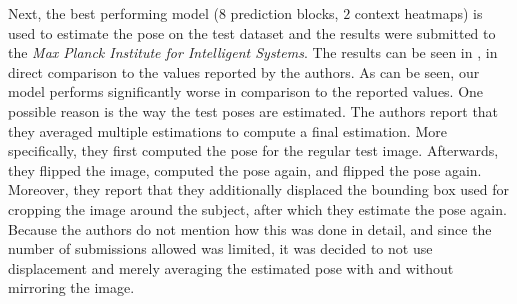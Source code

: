 Next, the best performing model ($8$ prediction blocks, $2$ context heatmaps) is used to estimate the pose on the test dataset and the results were submitted to the \textit{Max Planck Institute for Intelligent Systems}.
The results can be seen in , in direct comparison to the values reported by the authors.
As can be seen, our model performs significantly worse in comparison to the reported values.
One possible reason is the way the test poses are estimated.
The authors report that they averaged multiple estimations to compute a final estimation.
More specifically, they first computed the pose for the regular test image.
Afterwards, they flipped the image, computed the pose again, and flipped the pose again.
Moreover, they report that they additionally displaced the bounding box used for cropping the image around the subject, after which they estimate the pose again.
Because the authors do not mention how this was done in detail, and since the number of submissions allowed was limited, it was decided to not use displacement and merely averaging the estimated pose with and without mirroring the image.


\begin{table}[]
    \centering
    \caption{Our recreation in direct comparison to the original work by \cite{luvizon_2d/3d_2018}. Values represent PCKh using $\alpha = 0.5$.  } %
    \label{tab:mpii_test}
\end{table}


